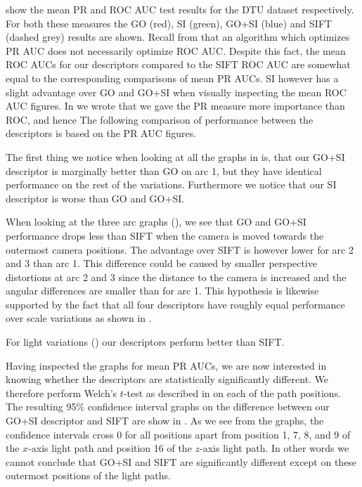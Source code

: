\documentclass[thesis.tex]{subfiles}
\begin{document}
 show the mean PR and ROC AUC test results for the DTU dataset respectively. For both these measures the GO (red), SI (green), GO+SI (blue) and SIFT (dashed grey) results are shown. Recall from  that an algorithm which optimizes PR AUC does not necessarily optimize ROC AUC. Despite this fact, the mean ROC AUCs for our descriptors compared to the SIFT ROC AUC are somewhat equal to the corresponding comparisons of mean PR AUCs. SI however has a slight advantage over GO and GO+SI when visually inspecting the mean ROC AUC figures. In  we wrote that we gave the PR measure more importance than ROC, and hence The following comparison of performance between the descriptors is based on the PR AUC figures.

The first thing we notice when looking at all the graphs in  is, that our GO+SI descriptor is marginally better than GO on arc 1, but they have identical performance on the rest of the variations. Furthermore we notice that our SI descriptor is worse than GO and GO+SI.

When looking at the three arc graphs (), we see that GO and GO+SI performance drops less than SIFT when the camera is moved towards the outermost camera positions. The advantage over SIFT is however lower for arc 2 and 3 than arc 1. This difference could be caused by smaller perspective distortions at arc 2 and 3 since the distance to the camera is increased and the angular differences are smaller than for arc 1.
This hypothesis is likewise supported by the fact that all four descriptors have roughly equal performance over scale variations as shown in .

For light variations () our descriptors perform better than SIFT.

Having inspected the graphs for mean PR AUCs, we are now interested in knowing whether the descriptors are statistically significantly different. We therefore perform Welch's $t$-test as described in  on each of the path positions. The resulting 95\% confidence interval graphs on the difference between our GO+SI descriptor and SIFT are show in . As we see from the graphs, the confidence intervals cross 0 for all positions apart from position 1, 7, 8, and 9 of the $x$-axis light path and position 16 of the $z$-axis light path. In other words we cannot conclude that GO+SI and SIFT are significantly different except on these outermost positions of the light paths.
\end{document}

